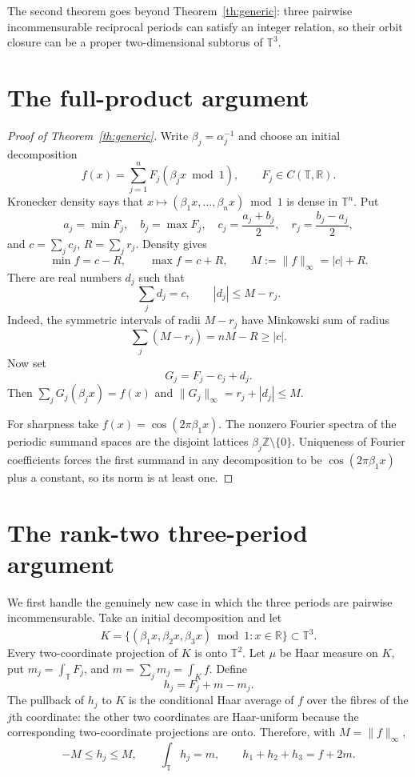 \documentclass[11pt]{article}
\newcommand{\T}{\mathbb T}
\newcommand{\R}{\mathbb R}
\begin{document}
The second theorem goes beyond Theorem~\ref{th:generic}: three pairwise
incommensurable reciprocal periods can satisfy an integer relation, so their
orbit closure can be a proper two-dimensional subtorus of $\T^3$.

\section{The full-product argument}

\begin{proof}[Proof of Theorem~\ref{th:generic}]
Write $\beta_j=\alpha_j^{-1}$ and choose an initial decomposition
\[
 f(x)=\sum_{j=1}^n F_j(\beta_jx\bmod1),\qquad F_j\in C(\T,\R).
\]
Kronecker density says that $x\mapsto(\beta_1x,\ldots,\beta_nx)\bmod1$
is dense in $\T^n$.  Put
\[
 a_j=\min F_j,\quad b_j=\max F_j,\quad
 c_j=\frac{a_j+b_j}{2},\quad r_j=\frac{b_j-a_j}{2},
\]
and $c=\sum_jc_j$, $R=\sum_jr_j$.  Density gives
\[
 \min f=c-R,\qquad \max f=c+R,
 \qquad M:=\|f\|_\infty=|c|+R.
\]
There are real numbers $d_j$ such that
\[
 \sum_jd_j=c,\qquad |d_j|\le M-r_j.
\]
Indeed, the symmetric intervals of radii $M-r_j$ have Minkowski sum of
radius
\[
 \sum_j(M-r_j)=nM-R\ge |c|.
\]
Now set
\[
 G_j=F_j-c_j+d_j.
\]
Then $\sum_jG_j(\beta_jx)=f(x)$ and
$\|G_j\|_\infty=r_j+|d_j|\le M$.

For sharpness take $f(x)=\cos(2\pi\beta_1x)$.  The nonzero Fourier spectra of
the periodic summand spaces are the disjoint lattices
$\beta_j\mathbb Z\setminus\{0\}$.  Uniqueness of Fourier coefficients forces
the first summand in any decomposition to be
$\cos(2\pi\beta_1x)$ plus a constant, so its norm is at least one.
\end{proof}

\section{The rank-two three-period argument}

We first handle the genuinely new case in which the three periods are
pairwise incommensurable.  Take an initial decomposition and let
\[
 K=\overline{\{(\beta_1x,\beta_2x,\beta_3x)\bmod1:x\in\R\}}\subset\T^3.
\]
Every two-coordinate projection of $K$ is onto $\T^2$.  Let $\mu$ be Haar
measure on $K$, put $m_j=\int_\T F_j$, and $m=\sum_jm_j=\int_K f$.
Define
\[
 h_j=F_j+m-m_j.
\]
The pullback of $h_j$ to $K$ is the conditional Haar average of $f$ over the
fibres of the $j$th coordinate: the other two coordinates are Haar-uniform
because the corresponding two-coordinate projections are onto.  Therefore,
with $M=\|f\|_\infty$,
\begin{equation}\label{eq:bounds}
 -M\le h_j\le M,\qquad \int_\T h_j=m,
 \qquad h_1+h_2+h_3=f+2m.
\end{equation}
\end{document}
